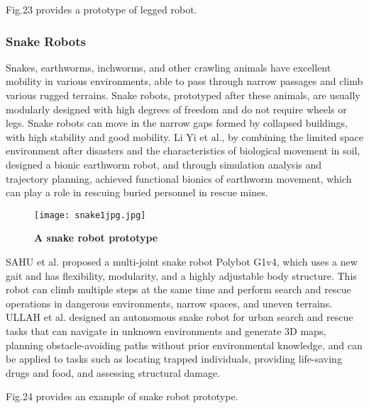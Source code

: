 \documentclass[conference]{IEEEtran}
\begin{document}
Fig.23 provides a prototype of legged robot.

\subsubsection{Snake Robots}
Snakes, earthworms, inchworms, and other crawling animals have excellent mobility in various environments\cite{b36}, able to pass through narrow passages and climb various rugged terrains. Snake robots, prototyped after these animals, are usually modularly designed with high degrees of freedom and do not require wheels or legs. Snake robots can move in the narrow gaps formed by collapsed buildings, with high stability and good mobility. Li Yi et al.\cite{b37}, by combining the limited space environment after disasters and the characteristics of biological movement in soil, designed a bionic earthworm robot, and through simulation analysis and trajectory planning, achieved functional bionics of earthworm movement, which can play a role in rescuing buried personnel in rescue mines.

\begin{figure}[h]
    \centering
    \texttt{[image: snake1jpg.jpg]}
    \caption{\textbf{A snake robot prototype}}
    \label{fig:enter-label}
\end{figure}

SAHU et al.\cite{b38} proposed a multi-joint snake robot Polybot G1v4, which uses a new gait and has flexibility, modularity, and a highly adjustable body structure. This robot can climb multiple steps at the same time and perform search and rescue operations in dangerous environments, narrow spaces, and uneven terrains. ULLAH et al.\cite{b39} designed an autonomous snake robot for urban search and rescue tasks that can navigate in unknown environments and generate 3D maps, planning obstacle-avoiding paths without prior environmental knowledge, and can be applied to tasks such as locating trapped individuals, providing life-saving drugs and food, and assessing structural damage.

Fig.24 provides an example of snake robot prototype.
\end{document}
